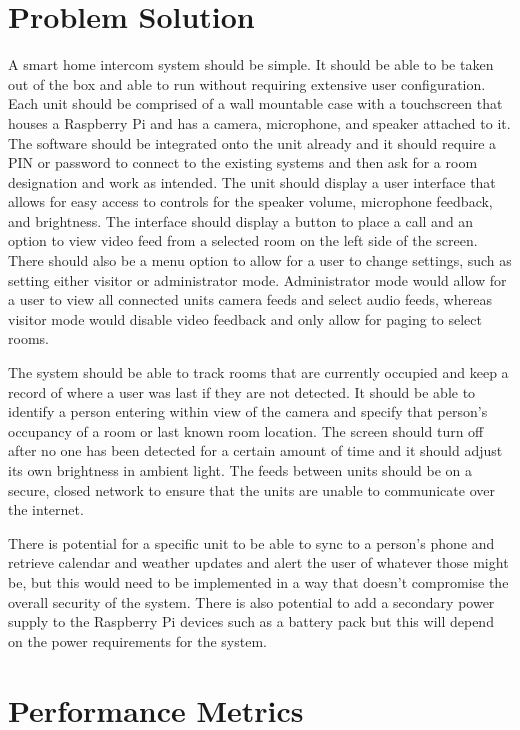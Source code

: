 \documentclass[onecolumn, draftclsnofoot,10pt, compsoc]{IEEEtran}
\begin{document}
\section{Problem Solution}
A smart home intercom system should be simple. It should be able to be taken out of the box and able to run without requiring extensive user configuration. Each unit should be comprised of a wall mountable case with a touchscreen that houses a Raspberry Pi and has a camera, microphone, and speaker attached to it. The software should be integrated onto the unit already and it should require a PIN or password to connect to the existing systems and then ask for a room designation and work as intended. The unit should display a user interface that allows for easy access to controls for the speaker volume, microphone feedback, and brightness. The interface should display a button to place a call and an option to view video feed from a selected room on the left side of the screen. There should also be a menu option to allow for a user to change settings, such as setting either visitor or administrator mode. Administrator mode would allow for a user to view all connected units camera feeds and select audio feeds, whereas visitor mode would disable video feedback and only allow for paging to select rooms.

The system should be able to track rooms that are currently occupied and keep a record of where a user was last if they are not detected. It should be able to identify a person entering within view of the camera and specify that person’s occupancy of a room or last known room location. The screen should turn off after no one has been detected for a certain amount of time and it should adjust its own brightness in ambient light. The feeds between units should be on a secure, closed network to ensure that the units are unable to communicate over the internet.

There is potential for a specific unit to be able to sync to a person’s phone and retrieve calendar and weather updates and alert the user of whatever those might be, but this would need to be implemented in a way that doesn’t compromise the overall security of the system. There is also potential to add a secondary power supply to the Raspberry Pi devices such as a battery pack but this will depend on the power requirements for the system.




\section{Performance Metrics}
\end{document}
